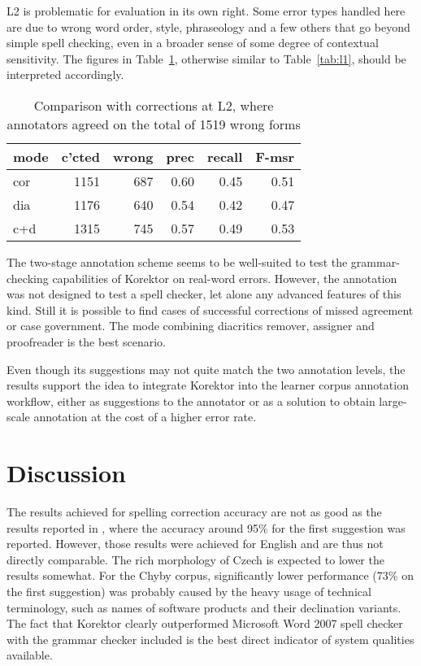 \documentclass[11pt]{article}
\begin{document}
L2 is problematic for evaluation in its own
right. Some error types handled here are due to wrong word order,
style, phraseology and a few others that go beyond simple spell
checking, even in a broader sense of some degree of contextual
sensitivity. The figures in Table~\ref{tab:l2}, otherwise similar to
Table~\ref{tab:l1}, should be interpreted accordingly.
						
\begin{table}[h]
\centering
\begin{tabular}[htbp]{l|rrrrr}                        
mode & c'cted & wrong & prec & recall & F-msr \\ \hline
cor & 1151 & 687 & 0.60 & 0.45 & 0.51 \\
dia & 1176 & 640 & 0.54 & 0.42 & 0.47 \\
c+d & 1315 & 745 & 0.57 & 0.49 & 0.53
\end{tabular}
\caption{Comparison with corrections at L2, where annotators agreed on the
total of 1519 wrong forms}
\label{tab:l2}
\end{table}


The two-stage annotation scheme seems to be well-suited to test the
grammar-checking capabilities of Korektor on real-word
errors. However, the annotation was not designed to test a spell
checker, let alone any advanced features of this kind. Still it is
possible to find cases of successful corrections of missed agreement
or case government. The mode combining diacritics remover, assigner
and proofreader is the best scenario.

Even though its suggestions may not quite match the two annotation
levels, the results support the idea to integrate Korektor into the
learner corpus annotation workflow, either as suggestions to the
annotator or as a solution to obtain large-scale annotation at the
cost of a higher error rate.

 

\section{Discussion}
\label{sec:discus}
The results achieved for spelling correction accuracy are not as good
as the results reported in , where the accuracy around
95\% for the first suggestion was reported. However, those results were achieved
for English and are thus not directly comparable. 
The rich morphology of Czech is expected to lower the results somewhat.
For the Chyby corpus, significantly lower performance (73\% on the first
suggestion) was probably caused by the heavy usage of technical terminology,
such as names of software products and their declination variants.
The fact that Korektor clearly
outperformed Microsoft Word 2007 spell checker with the grammar checker included
is the best direct indicator of system qualities available.
\end{document}
